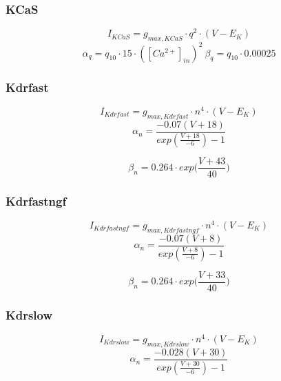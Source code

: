 \documentclass[12pt]{article}
\begin{document}
\subsubsection{KCaS}
\begin{equation}
I_{KCaS} = g_{max, KCaS} \cdot q^2 \cdot (V - E_K)
\end{equation}
\begin{equation}
\alpha_q = q_{10} \cdot 15 \cdot ([Ca^{2+}]_{in})^2 \  \beta_q = q_{10} \cdot 0.00025
\end{equation}

\subsubsection{Kdrfast}
\begin{equation}
I_{Kdrfast} = g_{max, Kdrfast} \cdot n^4 \cdot (V - E_K)
\end{equation}
\begin{equation}
\alpha_n = \frac{-0.07(V + 18)}{exp(\frac{V + 18}{-6}) - 1}
\end{equation}

\begin{equation}
\beta_n = 0.264 \cdot exp \Big( \frac{V + 43}{40} \Big)
\end{equation}

\subsubsection{Kdrfastngf}
\begin{equation}
I_{Kdrfastngf} = g_{max, Kdrfastngf} \cdot n^4 \cdot (V - E_K)
\end{equation}
\begin{equation}
\alpha_n = \frac{-0.07(V + 8)}{exp(\frac{V + 8}{-6}) - 1}
\end{equation}

\begin{equation}
\beta_n = 0.264 \cdot exp \Big( \frac{V + 33}{40} \Big)
\end{equation}

\subsubsection{Kdrslow}
\begin{equation}
I_{Kdrslow} = g_{max, Kdrslow} \cdot n^4 \cdot (V - E_K)
\end{equation}
\begin{equation}
\alpha_n = \frac{-0.028(V + 30)}{exp(\frac{V + 30}{-6}) - 1}
\end{equation}
\end{document}

